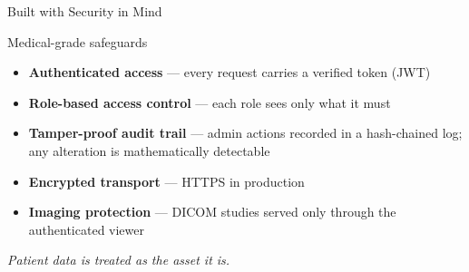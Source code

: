 \documentclass[aspectratio=169,11pt]{beamer}
\begin{document}
\begin{frame}{Built with Security in Mind}
  \begin{block}{Medical-grade safeguards}
    \begin{itemize}
      \item \textbf{Authenticated access} --- every request carries a verified token (JWT)
      \item \textbf{Role-based access control} --- each role sees only what it must
      \item \textbf{Tamper-proof audit trail} --- admin actions recorded in a
            hash-chained log; any alteration is mathematically detectable
      \item \textbf{Encrypted transport} --- HTTPS in production
      \item \textbf{Imaging protection} --- DICOM studies served only through the
            authenticated viewer
    \end{itemize}
  \end{block}
  \vfill
  \centering
  {\itshape\color{TealDark} Patient data is treated as the asset it is.}
\end{frame}
\end{document}
